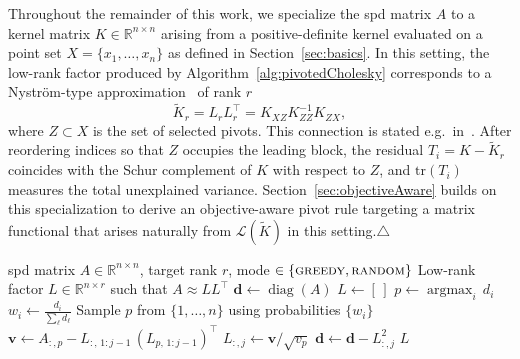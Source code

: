 \documentclass[onefignum,onetabnum]{siamart250211}
\DeclareMathOperator*{\argmax}{argmax}
\begin{document}
\begin{remark}
\label{rem:nystrom}
Throughout the remainder of this work, we specialize the spd matrix $A$ to a kernel matrix $K \in \mathbb{R}^{n \times n}$ arising from a positive-definite kernel evaluated on a point set $X = \{x_1, \ldots, x_n\}$ as defined in Section~\ref{sec:basics}. In this setting, the low-rank factor produced by Algorithm~\ref{alg:pivotedCholesky} corresponds to a Nystr\"om-type approximation~\cite{williams.2000} of rank $r$
\begin{equation*}
    \widetilde{K}_r = L_r L_r^\top = K_{XZ} K_{ZZ}^{-1} K_{ZX},
\end{equation*}
where $Z \subset X$ is the set of selected pivots. This connection is stated e.g.~in~\cite[Section 5.4]{halko.2011}. After reordering indices so that $Z$ occupies the leading block, the residual $T_i = K - \widetilde{K}_r$ coincides with the Schur complement of $K$ with respect to $Z$, and  $\mathrm{tr}(T_i)$ measures the total unexplained variance.
Section~\ref{sec:objectiveAware} builds on this  specialization to derive an objective-aware pivot rule targeting a matrix functional that arises naturally from $\mathcal{L}(\widetilde{K})$ in this setting.\hfill$\triangle$
\end{remark}

\begin{algorithm}[t]
\caption{\textsc{(Randomly) Pivoted Cholesky}} \label{alg:pivotedCholesky}
\begin{algorithmic}[1]
\REQUIRE spd matrix $A \in \mathbb{R}^{n \times n}$,
target rank $r$, mode $\in \{\textsc{greedy}, \textsc{random}\}$
\ENSURE Low-rank factor $L \in \mathbb{R}^{n \times r}$ such that $A \approx LL^\top$
\STATE $\bm{d} \leftarrow \operatorname{diag}(A)$ 
\STATE $L \leftarrow [\,]$
        \STATE $p \leftarrow \argmax_i\, d_i$
        \STATE $\displaystyle w_i \leftarrow \frac{{d}_i}{\sum_{\ell} {d}_\ell}$
        \STATE Sample $p$ from $\{1,\dots,n\}$ using probabilities $\{w_i\}$     
    \ENDIF
    \STATE $\bm{v} \leftarrow A_{:,p} - L_{:,\,1:j-1}\,(L_{p,\,1:j-1})^\top$ 
    \STATE $L_{:,j} \leftarrow \bm{v} / \sqrt{v_p}$ 
    \STATE $\bm{d} \leftarrow \bm{d} - L_{:,j}^2$ 
\ENDFOR
\RETURN $L$
\end{algorithmic}
\end{algorithm}
\end{document}
